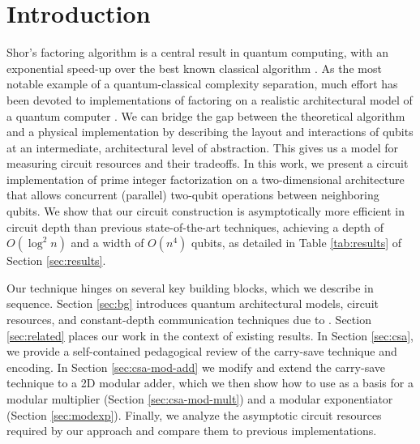 \documentclass[twoside]{article}
\begin{document}
\vspace*{10pt}

\vspace*{3pt}

\vspace*{1pt}\textlineskip    %
\section{Introduction}
\label{sec:intro}

Shor's factoring algorithm is a central result in quantum computing, with an
exponential speed-up over the best known classical algorithm \cite{Shor1994}.
As the most notable example of a quantum-classical complexity separation, much
effort has been devoted to implementations of factoring on a
realistic architectural model of a quantum computer
\cite{Beauregard2002,Kutin2006,VanMeter2006,VanMeter2005,VanMeterIL2005}.
We can bridge the gap between
the theoretical algorithm and a physical implementation by describing
the layout and interactions of qubits at an intermediate,
architectural level of abstraction.
This gives us a model for measuring circuit resources and their tradeoffs.
In this work, we present a circuit implementation of prime
integer factorization
on a two-dimensional architecture that allows concurrent (parallel) two-qubit operations
between neighboring qubits.
We show that our circuit construction is asymptotically more efficient in circuit depth than previous state-of-the-art techniques, achieving a depth of $O(\log^2 n)$ and a width of $O(n^4)$ qubits, as detailed in Table
\ref{tab:results} of Section \ref{sec:results}.

Our technique hinges on several key building blocks, which we describe in sequence.
Section \ref{sec:bg} introduces quantum architectural models, circuit
resources, and constant-depth communication techniques due to
\cite{Harrow2012,Rosenbaum2012}.
Section \ref{sec:related} places our work in the context of existing
results.
In Section \ref{sec:csa}, we provide a self-contained pedagogical review
of the carry-save technique and encoding.
In Section \ref{sec:csa-mod-add} we modify and extend the carry-save technique to a 2D
modular adder,
which we then show how to use as a basis for a modular multiplier
(Section \ref{sec:csa-mod-mult}) and a modular exponentiator
(Section \ref{sec:modexp}).
Finally, we analyze the asymptotic circuit resources required by our
approach and compare them to previous implementations.
\end{document}
